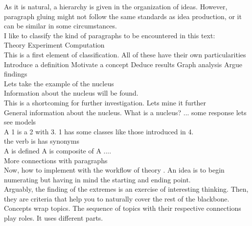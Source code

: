 \documentclass[openany]{book}
\begin{document}
As it is natural, a hierarchy is given in the organization of ideas. However, paragraph gluing might not follow the same standards as idea production, or it can be similar in some circumstances.  \\

I like to classify the kind of paragraphs to be encountered in this text:  \\

Theory  
Experiment 
Computation \\

This is a first element of classification. All of these have their own particularities  \\

Introduce a definition  
Motivate a concept
Deduce results
Graph analysis 
Argue findings  \\

Lets take the example of the nucleus  \\
 
Information about the nucleus will be found.  \\
 
This is a shortcoming for further investigation. Lets mine it further  \\

General information about the nucleus. 
	What is a nucleus? ... some response lets see models  \\
	
	A 1 is a 2 with 3. 1 has some classes like those introduced in 4.  \\
	
	the verb is has synonyms \\
	
	A is defined
	A is composite of 
	A ....  \\
	
	More connections with paragraphs \\
	 
	Now, how to implement with the workflow of theory 
	. An idea is to begin numerating but having in mind the starting and ending point.  \\
	
	Arguably, the finding of the extremes is an exercise of interesting thinking. Then, they are criteria that help you to naturally cover the rest of the blackbone.  \\
 
 
 Concepts wrap topics. The sequence of topics with their respective connections play roles. It uses different parts.  \\
 
\end{document}

